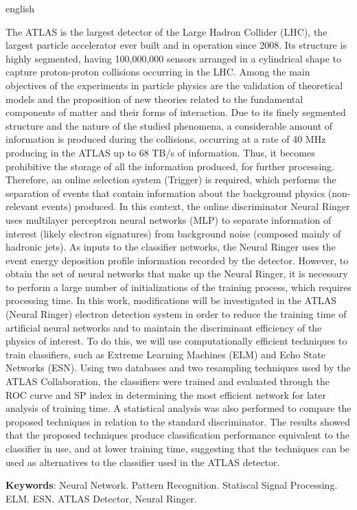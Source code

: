 \begin{resumo}[Abstract]
 \begin{otherlanguage*}{english}
 
The ATLAS is the largest detector of the Large Hadron Collider (LHC), the largest particle accelerator ever built and in operation since 2008. Its structure is highly segmented, having  100,000,000 sensors arranged in a cylindrical shape to capture proton-proton collisions occurring in the LHC. Among the main objectives of the experiments in particle physics are the validation of theoretical models and the proposition of new theories related to the fundamental components of matter and their forms of interaction. Due to its finely segmented structure and the nature of the studied phenomena, a considerable amount of information is produced during the collisions, occurring at a rate of 40 MHz producing in the ATLAS up to 68 TB/s of information. Thus, it becomes prohibitive the storage of all the information produced, for further processing. Therefore, an online selection system (Trigger) is required, which performs the separation of events that contain information about the background physics (non-relevant events) produced. In this context, the online discriminator Neural Ringer uses multilayer perceptron neural networks (MLP) to separate information of interest (likely electron signatures) from background noise (composed mainly of hadronic jets). As inputs to the classifier networks, the Neural Ringer uses the event energy deposition profile information recorded by the detector. However, to obtain the set of neural networks that make up the Neural Ringer, it is necessary to perform a large number of initializations of the training process, which requires processing time. In this work, modifications will be investigated in the ATLAS (Neural Ringer) electron detection system in order to reduce the training time of artificial neural networks and to maintain the discriminant efficiency of the physics of interest. To do this, we will use computationally efficient techniques to train classifiers, such as Extreme Learning Machines (ELM) and Echo State Networks (ESN). Using two databases and two resampling techniques used by the ATLAS Collaboration, the classifiers were trained and evaluated through the ROC curve and SP index in determining the most efficient network for later analysis of training time. A statistical analysis was also performed to compare the proposed techniques in relation to the standard discriminator. The results showed that the proposed techniques produce classification performance equivalent to the classifier in use, and at lower training time, suggesting that the techniques can be used as alternatives to the classifier used in the ATLAS detector.
 
    \vspace{\onelineskip}
 
   \noindent 
   \textbf{Keywords}: Neural Network. Pattern Recognition. Statiscal Signal Processing. ELM. ESN. ATLAS Detector, Neural Ringer.
 \end{otherlanguage*}
\end{resumo}
